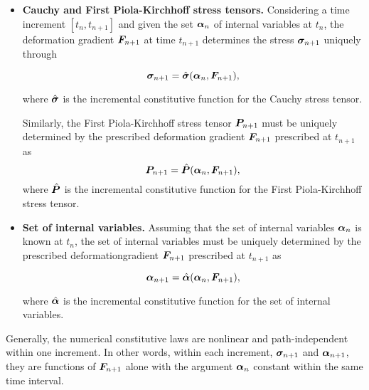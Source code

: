 \begin{itemize}
    \item \textbf{Cauchy and First Piola-Kirchhoff stress tensors.}   Considering a time increment $[t_n, t_{n+1}]$ and given the set $\bm{\alpha}_n$ of internal variables at $t_n$, the deformation gradient $\bm{F}_{n+1}$ at time $t_{n+1}$ determines the stress $\bm{\sigma}_{n+1}$ uniquely through
    \begin{highlight}
        \begin{equation}
            \bm{\sigma}_{n+1} = \hat{\bm{\sigma}}(\bm{\alpha}_n, \bm{F}_{n+1}), \label{eq:incremental_stress}
        \end{equation}
    \end{highlight}
    where $\hat{\bm{\sigma}}$ is the incremental constitutive function for the Cauchy stress tensor.

    Similarly, the First Piola-Kirchhoff stress tensor $\bm{P}_{n+1}$ must be uniquely determined by the prescribed deformation gradient $\bm{F}_{n+1}$ prescribed at $t_{n+1}$ as
    \begin{equation}
        \bm{P}_{n+1} = \hat{\bm{P}}(\bm{\alpha}_n, \bm{F}_{n+1}),
    \end{equation}
    where $\hat{\bm{P}}$ is the incremental constitutive function for the First Piola-Kirchhoff stress tensor.
    \item \textbf{Set of internal variables.} Assuming that the set of internal variables $\bm{\alpha}_n$ is known at $t_n$, the set of internal variables must be uniquely determined by the prescribed deformationgradient $\bm{F}_{n+1}$ prescribed at $t_{n+1}$ as
    \begin{highlight}
        \begin{equation}
             \bm{\alpha}_{n+1} =\hat{\bm{\alpha}}(\bm{\alpha}_n, \bm{F}_{n+1}), \label{eq:incremental_flux}
        \end{equation}
    \end{highlight}
    where $\hat{\bm{\alpha}}$ is the incremental constitutive function for the set of internal variables.
\end{itemize}

Generally, the numerical constitutive laws are nonlinear and path-independent within one increment.
In other words, within each increment, $\bm{\sigma}_{n+1}$ and $\bm{\alpha}_{n+1}$, they are functions of $\bm{F}_{n+1}$ alone with the argument $\bm{\alpha}_n$ constant within the same time interval.

